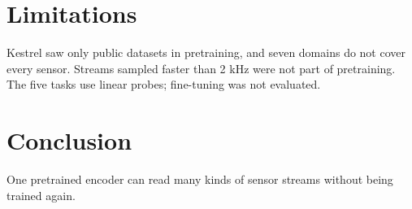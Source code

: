 \documentclass{article}
\begin{document}
\section{Limitations}
Kestrel saw only public datasets in pretraining, and seven domains do not cover every sensor.
Streams sampled faster than 2 kHz were not part of pretraining.
The five tasks use linear probes; fine-tuning was not evaluated.

\section{Conclusion}
One pretrained encoder can read many kinds of sensor streams without being trained again.
\end{document}
